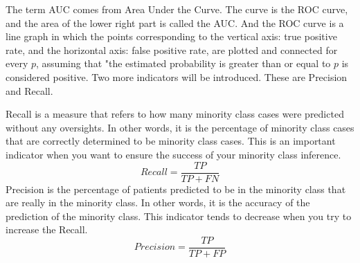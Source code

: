 The term AUC comes from Area Under the Curve.
The curve is the ROC curve, and the area of the lower right part is called the AUC.
And the ROC curve is a line graph in which the points corresponding to the vertical axis: true positive rate, and the horizontal axis: false positive rate, are plotted and connected for every $p$, assuming that "the estimated probability is greater than or equal to $p$ is considered positive.
Two more indicators will be introduced.
These are Precision and Recall.

Recall is a measure that refers to how many minority class cases were predicted without any oversights.
In other words, it is the percentage of minority class cases that are correctly determined to be minority class cases.
This is an important indicator when you want to ensure the success of your minority class inference.
$$
Recall = \frac{TP}{TP + FN}
$$
Precision is the percentage of patients predicted to be in the minority class that are really in the minority class.
In other words, it is the accuracy of the prediction of the minority class.
This indicator tends to decrease when you try to increase the Recall.
$$
Precision = \frac{TP}{TP + FP}
$$
